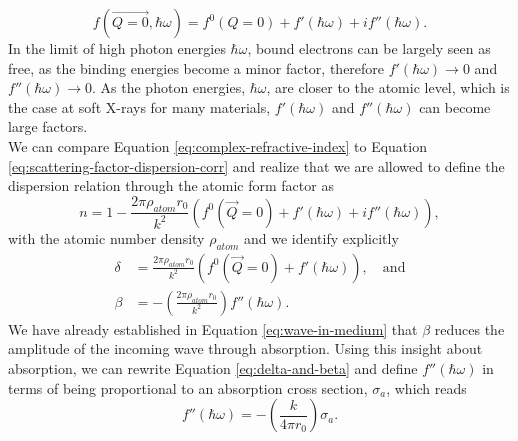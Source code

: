 \begin{equation}
f\left(\vec{Q=0},\hbar\omega\right)=f^{0}\left(Q=0\right)+f'\left(\hbar\omega\right)+i f''\left(\hbar\omega\right).
\label{eq:scattering-factor-dispersion-corr}
\end{equation}
In the limit of high photon energies $\hbar \omega$, bound electrons can be largely seen as free, as the binding energies become a minor factor, therefore $f'\left(\hbar\omega\right)\rightarrow 0$ and $f''\left(\hbar\omega\right)\rightarrow 0$. As the photon energies, $\hbar \omega$, are closer to the atomic level, which is the case at soft X-rays for many materials, $f'\left(\hbar\omega\right)$ and $f''\left(\hbar\omega\right)$ can become large factors.\\[1\baselineskip]
We can compare Equation \eqref{eq:complex-refractive-index} to Equation \eqref{eq:scattering-factor-dispersion-corr} and realize that we are allowed to define the dispersion relation through the atomic form factor as \citep[see][p.~76]{Als-Nielson-2011-JWS}
\begin{equation}
n= 1- \frac{2\pi \rho_{atom}r_{0}}{k^{2}}\left(f^{0}\left(\vec{Q}=0\right)+f'\left(\hbar\omega\right)+i f''\left(\hbar\omega\right)\right),
\label{eq:eq:complex-refractive-index-atomic-factors}
\end{equation}
with the atomic number density $\rho_{atom}$ and we identify explicitly
\begin{align}
\delta &= \frac{2 \pi \rho_{atom} r_{0}}{k^{2}}\left(f^{0}\left(\vec{Q}=0\right)+f'\left(\hbar\omega\right)\right),\quad \text{and}\\
\beta &= - \left(\frac{2\pi \rho_{atom}r_{0}}{k^{2}}\right)f''\left(\hbar\omega\right).
\label{eq:delta-and-beta}
\end{align}
We have already established in Equation \eqref{eq:wave-in-medium} that $\beta$ reduces the amplitude of the incoming wave through absorption. Using this insight about absorption, we can rewrite Equation \eqref{eq:delta-and-beta} and define $f''\left(\hbar\omega\right)$ in terms of being proportional to an absorption cross section, $\sigma_{a}$, which reads
\begin{equation}
f''\left(\hbar\omega\right)=-\left(\frac{k}{4\pi r_{0}}\right)\sigma_{a}.
\label{eq:f-2-definition}
\end{equation}
